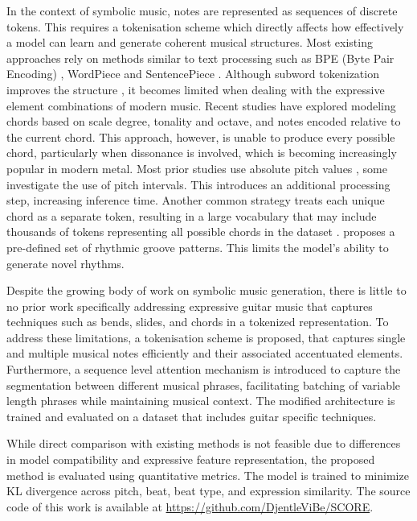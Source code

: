 \documentclass{article} %
\begin{document}
In the context of symbolic music, notes are represented as sequences of discrete tokens. This requires a tokenisation scheme which directly affects how effectively a 
model can learn and generate coherent musical structures. Most existing approaches rely on methods similar to text 
processing such as BPE (Byte Pair Encoding) \citep{sennrich2016neuralmachinetranslationrare}, WordPiece \citep{sentencepiece}
and SentencePiece \citep{kudo2018sentencepiecesimplelanguageindependent}. Although subword tokenization improves 
the structure \citep{kumar2023wordsmusicstudysubword} \citep{bpe-symbolic-music},
it becomes limited when dealing with the expressive element combinations of modern music. Recent studies 
\citep{gardin2024musiclang} have explored modeling chords based on scale degree, tonality and octave, and 
notes encoded relative to the current chord. This approach, however, is unable to produce every possible chord, 
particularly when dissonance is involved, which is becoming increasingly popular in modern metal. 
Most prior studies use absolute pitch values \citep{awsdeepcomposer}, some \citep{kermarec2022tokenization} investigate the use of pitch intervals.
This introduces an additional processing step, increasing inference time. Another common strategy treats each 
unique chord as a separate token, resulting in a large vocabulary that may include thousands of tokens 
representing all possible chords in the dataset \citep{harmony} \citep{Chordinator}. 
\citet{chen2020automatic} proposes a pre-defined set of rhythmic groove patterns. This limits the model's ability to generate novel rhythms. 

Despite the growing body of work on symbolic music generation, there is little to no prior work 
specifically addressing expressive guitar music that captures techniques such as bends, slides, 
and chords in a tokenized representation. To address these limitations, a tokenisation scheme is proposed, that captures single and multiple musical notes efficiently and 
their associated accentuated elements. Furthermore, a sequence level attention mechanism is introduced to capture the segmentation
between different musical phrases, facilitating batching of variable length phrases while maintaining musical context.
The modified architecture is trained and evaluated on a dataset \citep{SCORESET} that includes guitar specific techniques.

While direct comparison with existing methods is not feasible due to differences in 
model compatibility and expressive feature representation, the proposed method is 
evaluated using quantitative metrics. The model is trained to minimize KL 
divergence across pitch, beat, beat type, and expression similarity. The source code of this work is available at \url{https://github.com/DjentleViBe/SCORE}.
\end{document}
